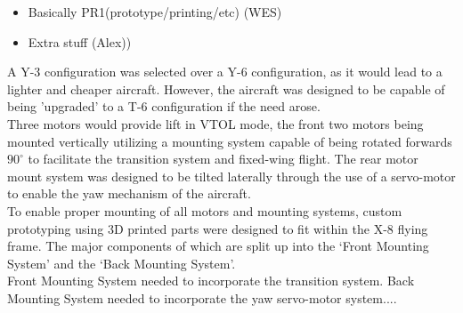 \color{red}
\begin{itemize}
\item Basically PR1(prototype/printing/etc) (WES)
\item Extra stuff (Alex))
\end{itemize}
\color{black}

A Y-3 configuration was selected over a Y-6 configuration, as it would lead to a lighter and cheaper aircraft. However, the aircraft was designed to be capable of being 'upgraded' to a T-6 configuration if the need arose.\\
Three motors would provide lift in VTOL mode, the front two motors being mounted vertically utilizing a mounting system capable of being rotated forwards $90^{\circ}$ to facilitate the transition system and fixed-wing flight. The rear motor mount system was designed to be tilted laterally through the use of a servo-motor to enable the yaw mechanism of the aircraft.\\
To enable proper mounting of all motors and mounting systems, custom prototyping using 3D printed parts were designed to fit within the X-8 flying frame. The major components of which are split up into the `Front  Mounting System' and the `Back Mounting System'.\\
Front Mounting System needed to incorporate the transition system.
Back Mounting System needed to incorporate the yaw servo-motor system....
